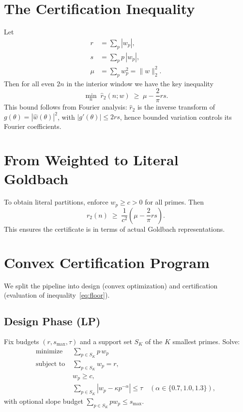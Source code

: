 \documentclass[11pt]{article}
\begin{document}
\section{The Certification Inequality}
Let
\begin{align}
    r &= \sum_p |w_p|, \\
    s &= \sum_p p \, |w_p|, \\
    \mu &= \sum_p w_p^2 = \|w\|_2^2.
\end{align}
Then for all even $2n$ in the interior window we have the key inequality
\begin{equation}\label{eq:floor}
    \min_n \; \widehat r_2(n;w) \; \geq \; \mu - \frac{2}{\pi} r s.
\end{equation}
This bound follows from Fourier analysis: $\widehat r_2$ is the inverse transform of $g(\theta)=|\widehat w(\theta)|^2$, with $|g'(\theta)|\le 2rs$, hence bounded variation controls its Fourier coefficients.

\section{From Weighted to Literal Goldbach}
To obtain literal partitions, enforce $w_p \geq c > 0$ for all primes. Then
\begin{equation}
    r_2(n) \; \geq \; \frac{1}{c^2}\left(\mu - \frac{2}{\pi} r s \right).
\end{equation}
This ensures the certificate is in terms of actual Goldbach representations.

\section{Convex Certification Program}
We split the pipeline into design (convex optimization) and certification (evaluation of inequality~\ref{eq:floor}).

\subsection{Design Phase (LP)}
Fix budgets $(r, s_{\max}, \tau)$ and a support set $S_K$ of the $K$ smallest primes. Solve:
\begin{align*}
    \text{minimize } & \sum_{p\in S_K} p \, w_p \\
    \text{subject to } & \sum_{p\in S_K} w_p = r, \\
    & w_p \ge c, \\
    & \sum_{p\in S_K} |w_p - \kappa p^{-\alpha}| \le \tau \quad (\alpha \in \{0.7,1.0,1.3\}),
\end{align*}
with optional slope budget $\sum_{p\in S_K} p w_p \le s_{\max}$.
\end{document}
